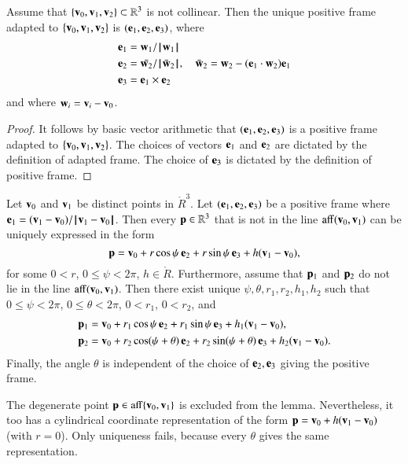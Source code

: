 \begin{lemma}[orthonormalization]
\label{lemma:frame}
  Assume that $\{{\mathbf v}_0,{\mathbf v}_1,{\mathbf v}_2\}\subset\mathbb{R}^3$ is not collinear.
  Then the unique positive frame adapted to 
  $\{{\mathbf v}_0,{\mathbf v}_1,{\mathbf v}_2\}$ is $({\mathbf e}_1,{\mathbf e}_2,{\mathbf e}_3)$, where
\begin{align*}
{\mathbf e}_1 &= {\mathbf w}_1/{{\hskip0.1em|\hskip-0.15em|\hskip0.1em}{\mathbf w}_1{\hskip0.1em|\hskip-0.15em|\hskip0.1em}}\\
{\mathbf e}_2 &= \bar{{\mathbf w}_2}/{{\hskip0.1em|\hskip-0.15em|\hskip0.1em}\bar{{\mathbf w}}_2{\hskip0.1em|\hskip-0.15em|\hskip0.1em}},\quad \bar{{\mathbf w}}_2 = {\mathbf w}_2 - ({\mathbf e}_1\cdot {\mathbf w}_2) {\mathbf e}_1\\
{\mathbf e}_3 &= {\mathbf e}_1 \times {\mathbf e}_2 
\end{align*}
and where ${\mathbf w}_i = {\mathbf v}_i - {\mathbf v}_0$.
\end{lemma}

\begin{proof} It follows by basic vector arithmetic that
  $({\mathbf e}_1,{\mathbf e}_2,{\mathbf e}_3)$ is a positive frame adapted to
  $\{{\mathbf v}_0,{\mathbf v}_1,{\mathbf v}_2\}$.  The choices of vectors ${\mathbf e}_1$ and ${\mathbf e}_2$ are
  dictated by the definition of adapted frame.  The choice of ${\mathbf e}_3$
  is dictated by the definition of positive frame.
\end{proof}

\begin{lemma}
Let ${\mathbf v}_0$ and ${\mathbf v}_1$ be distinct points in 
$\ring{R}^3$.  Let $({\mathbf e}_1,{\mathbf e}_2,{\mathbf e}_3)$ be a positive frame 
where $\e_1 = (\v_1-\v_0)/\norm{\v_1}{\v_0}$.
Then every
${\mathbf p}\in\mathbb{R}^3$ that is not in the line ${\operatorname{aff}}({\mathbf v}_0,{\mathbf v}_1)$
can be uniquely expressed in the form
\[ 
{\mathbf p} = {\mathbf v}_0 + r\cos\psi\, {\mathbf e}_2 + r\sin\psi\, {\mathbf e}_3 + h ({\mathbf v}_1-{\mathbf v}_0),
\] 
%
%
for some $0< r$, $0\le \psi < 2\pi$, $h\in\ring{R}$.
Furthermore,
assume that ${\mathbf p}_1$ and ${\mathbf p}_2$ do
not lie in the line ${\operatorname{aff}}({\mathbf v}_0,{\mathbf v}_1)$.
Then there exist unique $\psi,\theta,r_1,r_2,h_1,h_2$
such
that $0\le\psi<2\pi$, $0\le\theta < 2\pi$, $0 < r_1$, $0 < r_2$, and
\begin{align*}
{\mathbf p}_1 &= {\mathbf v}_0 + r_1\cos\psi\, {\mathbf e}_2 + r_1\sin\psi\, {\mathbf e}_3 + h_1({\mathbf v}_1-{\mathbf v}_0),\\
{\mathbf p}_2 &= {\mathbf v}_0 + r_2\cos(\psi+\theta)\, {\mathbf e}_2 + r_2\sin(\psi+\theta)\, {\mathbf e}_3 
+ h_2({\mathbf v}_1-{\mathbf v}_0).
\end{align*}
Finally, the angle $\theta$ is independent of the choice of ${\mathbf e}_2,{\mathbf e}_3$
giving the positive frame.
\end{lemma}
%
%
%
%
%
%
%
The degenerate point ${\mathbf p}\in{\operatorname{aff}}\{{\mathbf v}_0,{\mathbf v}_1\}$ is excluded from the
lemma.  Nevertheless, it too has a cylindrical coordinate
representation of the form ${\mathbf p} = {\mathbf v}_0 + h({\mathbf v}_1-{\mathbf v}_0)$ (with $r=0$).
Only uniqueness fails, because every $\theta$ gives the same
representation.

